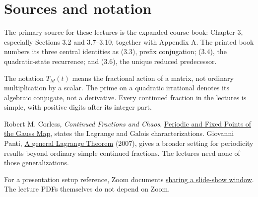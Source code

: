 \documentclass[11pt]{article}
\newcounter{slide}
\begin{document}
\section*{Sources and notation}
The primary source for these lectures is the expanded course book:
Chapter 3, especially Sections 3.2 and 3.7--3.10, together with
Appendix A. The printed book numbers its three central identities
as (3.3), prefix conjugation; (3.4), the quadratic-state recurrence;
and (3.6), the unique reduced predecessor.

The notation $T_M(t)$ means the fractional action of a matrix,
not ordinary multiplication by a scalar. The prime on a quadratic
irrational denotes its algebraic conjugate, not a derivative.
Every continued fraction in the lectures is simple, with positive
digits after its integer part.

Robert M. Corless, \emph{Continued Fractions and Chaos},
\href{https://www.cecm.sfu.ca/organics/papers/corless/confrac/html/node6-an.shtml}{Periodic and Fixed Points of the Gauss Map},
states the Lagrange and Galois characterizations.
Giovanni Panti, \href{https://arxiv.org/abs/0712.2996}{A general Lagrange Theorem}
(2007), gives a broader setting for periodicity results beyond
ordinary simple continued fractions. The lectures need none of
those generalizations.

For a presentation setup reference, Zoom documents
\href{https://support.zoom.com/hc/en/article?id=zm_kb&sysparm_article=KB0068635}{sharing a slide-show window}.
The lecture PDFs themselves do not depend on Zoom.
\end{document}
